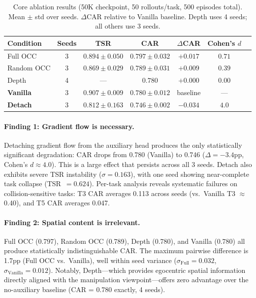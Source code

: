 \documentclass[10pt,letterpaper]{article}
\begin{document}
\begin{table}[t]
\centering
\caption{Core ablation results (50K checkpoint, 50 rollouts/task, 500 episodes total). Mean $\pm$ std over seeds. $\Delta$CAR relative to Vanilla baseline. Depth uses 4 seeds; all others use 3 seeds.}
\label{tab:core}
\begin{tabular}{lcccccc}
\toprule
Condition & Seeds & TSR & CAR & $\Delta$CAR & Cohen's $d$ \\
\midrule
Full OCC    & 3 & $0.894 \pm 0.050$ & $0.797 \pm 0.032$ & $+0.017$ & $0.71$ \\
Random OCC  & 3 & $0.869 \pm 0.029$ & $0.789 \pm 0.031$ & $+0.009$ & $0.39$ \\
Depth       & 4 & ---               & $0.780$           & $+0.000$ & $0.00$ \\
\textbf{Vanilla}     & 3 & $0.907 \pm 0.009$ & $0.780 \pm 0.012$ & baseline & --- \\
\midrule
\textbf{Detach}      & 3 & $0.812 \pm 0.163$ & $0.746 \pm 0.002$ & $-0.034$ & $\mathbf{4.0}$ \\
\bottomrule
\end{tabular}
\end{table}

\paragraph{Finding 1: Gradient flow is necessary.}
Detaching gradient flow from the auxiliary head produces the only statistically significant degradation: CAR drops from 0.780 (Vanilla) to 0.746 ($\Delta = -3.4$pp, Cohen's $d \approx 4.0$). This is a large effect that persists across all 3 seeds. Detach also exhibits severe TSR instability ($\sigma = 0.163$), with one seed showing near-complete task collapse (TSR~$= 0.624$). Per-task analysis reveals systematic failures on collision-sensitive tasks: T3 CAR averages 0.113 across seeds (vs.\ Vanilla T3 $\approx$ 0.40), and T5 CAR averages 0.047.

\paragraph{Finding 2: Spatial content is irrelevant.}
Full OCC (0.797), Random OCC (0.789), Depth (0.780), and Vanilla (0.780) all produce statistically indistinguishable CAR. The maximum pairwise difference is 1.7pp (Full OCC vs.\ Vanilla), well within seed variance ($\sigma_{\text{Full}} = 0.032$, $\sigma_{\text{Vanilla}} = 0.012$). Notably, Depth---which provides egocentric spatial information directly aligned with the manipulation viewpoint---offers zero advantage over the no-auxiliary baseline (CAR = 0.780 exactly, 4 seeds).
\end{document}
